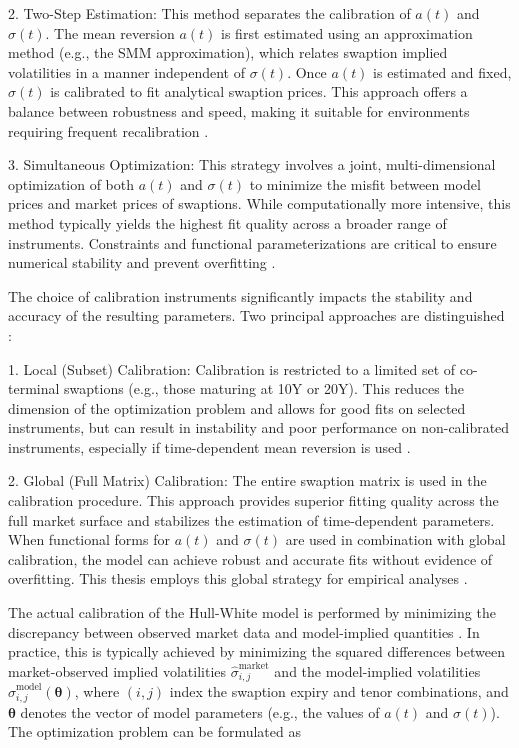 2. Two-Step Estimation: This method separates the calibration of $a(t)$ and $\sigma(t)$. The mean reversion $a(t)$ is first estimated using an approximation method (e.g., the SMM approximation), which relates swaption implied volatilities in a manner independent of $\sigma(t)$. Once $a(t)$ is estimated and fixed, $\sigma(t)$ is calibrated to fit analytical swaption prices. This approach offers a balance between robustness and speed, making it suitable for environments requiring frequent recalibration \parencite[pp.~13--14]{gurrieri2009calibration}.

3. Simultaneous Optimization: This strategy involves a joint, multi-dimensional optimization of both $a(t)$ and $\sigma(t)$ to minimize the misfit between model prices and market prices of swaptions. While computationally more intensive, this method typically yields the highest fit quality across a broader range of instruments. Constraints and functional parameterizations are critical to ensure numerical stability and prevent overfitting \parencite[p.~14]{gurrieri2009calibration}.

The choice of calibration instruments significantly impacts the stability and accuracy of the resulting parameters. Two principal approaches are distinguished \parencite[p.~16]{gurrieri2009calibration}:

1. Local (Subset) Calibration: Calibration is restricted to a limited set of co-terminal swaptions (e.g., those maturing at 10Y or 20Y). This reduces the dimension of the optimization problem and allows for good fits on selected instruments, but can result in instability and poor performance on non-calibrated instruments, especially if time-dependent mean reversion is used \parencite[pp.~16--24]{gurrieri2009calibration}.
    
2. Global (Full Matrix) Calibration: The entire swaption matrix is used in the calibration procedure. This approach provides superior fitting quality across the full market surface and stabilizes the estimation of time-dependent parameters. When functional forms for $a(t)$ and $\sigma(t)$ are used in combination with global calibration, the model can achieve robust and accurate fits without evidence of overfitting. This thesis employs this global strategy for empirical analyses \parencite[pp.~24--29]{gurrieri2009calibration}.

The actual calibration of the Hull-White model is performed by minimizing the discrepancy between observed market data and model-implied quantities \parencite[p.~2]{alaya2021deep}. In practice, this is typically achieved by minimizing the squared differences between market-observed implied volatilities $\hat{\sigma}^{\text{market}}_{i,j}$ and the model-implied volatilities $\hat{\sigma}^{\text{model}}_{i,j}(\boldsymbol{\theta})$, where $(i,j)$ index the swaption expiry and tenor combinations, and $\boldsymbol{\theta}$ denotes the vector of model parameters (e.g., the values of $a(t)$ and $\sigma(t)$). The optimization problem can be formulated as

